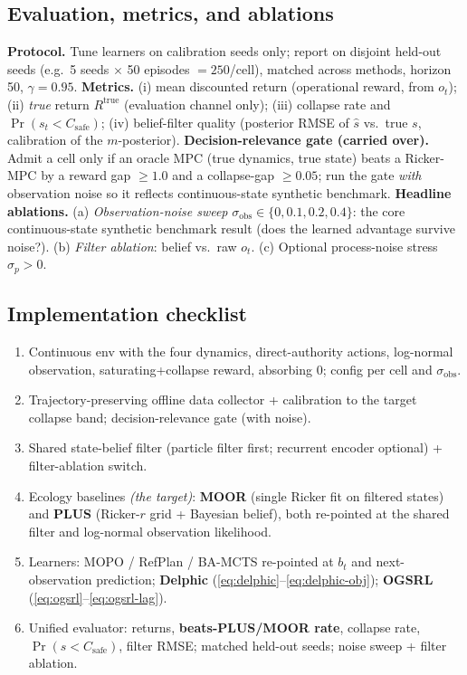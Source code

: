 \documentclass[11pt]{article}
\newcommand{\sobs}{\sigma_{\mathrm{obs}}}
\newcommand{\Csafe}{C_{\mathrm{safe}}}
\begin{document}
\subsection{Evaluation, metrics, and ablations}
\textbf{Protocol.} Tune learners on calibration seeds only; report on disjoint
held-out seeds (e.g.\ 5 seeds $\times$ 50 episodes $=250$/cell), matched across
methods, horizon 50, $\gamma{=}0.95$.
\textbf{Metrics.} (i) mean discounted return (operational reward, from $o_t$);
(ii) \emph{true} return $R^{\mathrm{true}}$ (evaluation channel only);
(iii) collapse rate and $\Pr(s_t<\Csafe)$; (iv) belief-filter quality
(posterior RMSE of $\hat s$ vs.\ true $s$, calibration of the $m$-posterior).
\textbf{Decision-relevance gate (carried over).} Admit a cell only if an oracle MPC
(true dynamics, true state) beats a Ricker-MPC by a reward gap $\ge 1.0$ and a
collapse-gap $\ge 0.05$; run the gate \emph{with} observation noise so it reflects
continuous-state synthetic benchmark.
\textbf{Headline ablations.} (a) \emph{Observation-noise sweep} $\sobs\in\{0,0.1,0.2,0.4\}$:
the core continuous-state synthetic benchmark result (does the learned advantage survive noise?). (b)
\emph{Filter ablation}: belief vs.\ raw $o_t$. (c) Optional process-noise stress
$\sigma_p>0$.

\subsection{Implementation checklist}
\begin{enumerate}[nosep,leftmargin=1.6em]
\item Continuous env with the four dynamics, direct-authority actions, log-normal
observation, saturating+collapse reward, absorbing $0$; config per cell and $\sobs$.
\item Trajectory-preserving offline data collector + calibration to the target
collapse band; decision-relevance gate (with noise).
\item Shared state-belief filter (particle filter first; recurrent encoder
optional) + filter-ablation switch.
\item Ecology baselines \emph{(the target)}: \textbf{MOOR} (single Ricker fit on
filtered states) and \textbf{PLUS} (Ricker-$r$ grid + Bayesian belief), both
re-pointed at the shared filter and log-normal observation likelihood.
\item Learners: MOPO / RefPlan / BA-MCTS re-pointed at $b_t$ and next-observation
prediction; \textbf{Delphic} (\eqref{eq:delphic}--\eqref{eq:delphic-obj});
\textbf{OGSRL} (\eqref{eq:ogsrl}--\eqref{eq:ogsrl-lag}).
\item Unified evaluator: returns, \textbf{beats-PLUS/MOOR rate}, collapse rate,
$\Pr(s<\Csafe)$, filter RMSE; matched held-out seeds; noise sweep + filter ablation.
\end{enumerate}
\end{document}
